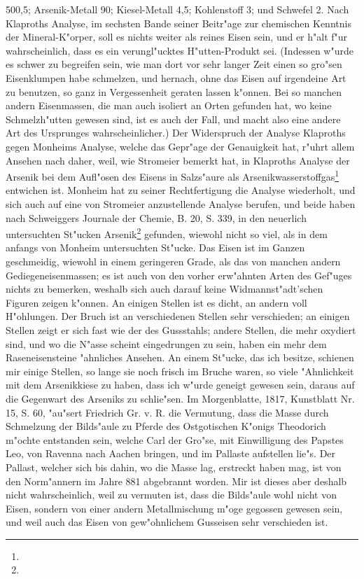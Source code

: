 \documentclass[a4paper, 11pt, oneside, polutonikogreek, german]{article}
\begin{document}
500,5; Arsenik-Metall 90; Kiesel-Metall 4,5; Kohlenstoff 3; und Schwefel 2. Nach Klaproths Analyse, im sechsten Bande seiner Beitr"age zur chemischen Kenntnis der Mineral-K"orper, soll es nichts weiter als reines Eisen sein, und er h"alt f"ur wahrscheinlich, dass es ein verungl"ucktes H"utten-Produkt sei. (Indessen w"urde es schwer zu begreifen sein, wie man dort vor sehr langer Zeit einen so gro"sen Eisenklumpen habe schmelzen, und hernach, ohne das Eisen auf irgendeine Art zu benutzen, so ganz in Vergessenheit geraten lassen k"onnen. Bei so manchen andern Eisenmassen, die man auch isoliert an Orten gefunden hat, wo keine Schmelzh"utten gewesen sind, ist es auch der Fall, und macht also eine andere Art des Ursprunges wahrscheinlicher.) Der Widerspruch der Analyse Klaproths gegen Monheims Analyse, welche das Gepr"age der Genauigkeit hat, r"uhrt allem Ansehen nach daher, weil, wie Stromeier bemerkt hat, in Klaproths Analyse der Arsenik bei dem Aufl"osen des Eisens in Salzs"aure als Arsenikwasserstoffgas\footnote{} entwichen ist. Monheim hat zu seiner Rechtfertigung die Analyse wiederholt, und sich auch auf eine von Stromeier anzustellende Analyse berufen, und beide haben nach Schweiggers Journale der Chemie, B. 20, S. 339, in den neuerlich untersuchten St"ucken Arsenik\footnote{} gefunden, wiewohl nicht so viel, als in dem anfangs von Monheim untersuchten St"ucke. Das Eisen ist im Ganzen geschmeidig, wiewohl in einem geringeren Grade, als das von manchen andern Gediegeneisenmassen; es ist auch von den vorher erw"ahnten Arten des Gef"uges nichts zu bemerken, weshalb sich auch darauf keine Widmannst"adt'schen Figuren zeigen k"onnen. An einigen Stellen ist es dicht, an andern voll H"ohlungen. Der Bruch ist an verschiedenen Stellen sehr verschieden; an einigen Stellen zeigt er sich fast wie der des Gussstahls; andere Stellen, die mehr oxydiert sind, und wo die N"asse scheint eingedrungen zu sein, haben ein mehr dem Raseneisensteine "ahnliches Ansehen. An einem St"ucke, das ich besitze, schienen mir einige Stellen, so lange sie noch frisch im Bruche waren, so viele "Ahnlichkeit mit dem Arsenikkiese zu haben, dass ich w"urde geneigt gewesen sein, daraus auf die Gegenwart des Arseniks zu schlie"sen. Im Morgenblatte, 1817, Kunstblatt Nr. 15, S. 60, "au"sert Friedrich Gr. v. R. die Vermutung, dass die Masse durch Schmelzung der Bilds"aule zu Pferde des Ostgotischen K"onigs Theodorich m"ochte entstanden sein, welche Carl der Gro"se, mit Einwilligung des Papstes Leo, von Ravenna nach Aachen bringen, und im Pallaste aufstellen lie"s. Der Pallast, welcher sich bis dahin, wo die Masse lag, erstreckt haben mag, ist von den Norm"annern im Jahre 881 abgebrannt worden. Mir ist dieses aber deshalb nicht wahrscheinlich, weil zu vermuten ist, dass die Bilds"aule wohl nicht von Eisen, sondern von einer andern Metallmischung m"oge gegossen gewesen sein, und weil auch das Eisen von gew"ohnlichem Gusseisen sehr verschieden ist.
\end{document}
